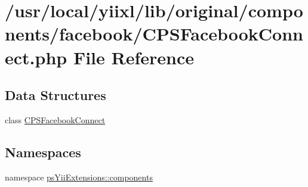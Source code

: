 \hypertarget{CPSFacebookConnect_8php}{
\section{/usr/local/yiixl/lib/original/components/facebook/CPSFacebookConnect.php File Reference}
\label{CPSFacebookConnect_8php}
}
\subsection*{Data Structures}
\begin{DoxyCompactItemize}
\item 
class \hyperlink{classCPSFacebookConnect}{CPSFacebookConnect}
\end{DoxyCompactItemize}
\subsection*{Namespaces}
\begin{DoxyCompactItemize}
\item 
namespace \hyperlink{namespacepsYiiExtensions_1_1components}{psYiiExtensions::components}
\end{DoxyCompactItemize}
